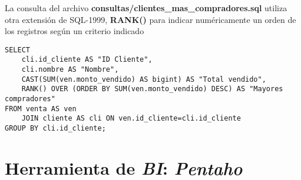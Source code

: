 La consulta del archivo \textbf{consultas/clientes\_mas\_compradores.sql} utiliza otra extensión de SQL-1999, \textbf{RANK()} para indicar numéricamente un orden de los registros según un criterio indicado  

\vspace*{5mm}
\begin{lstlisting}[title=Clientes que generan mayores ingresos para la empresa]
SELECT 
    cli.id_cliente AS "ID Cliente", 
    cli.nombre AS "Nombre", 
    CAST(SUM(ven.monto_vendido) AS bigint) AS "Total vendido", 
    RANK() OVER (ORDER BY SUM(ven.monto_vendido) DESC) AS "Mayores compradores" 
FROM venta AS ven 
    JOIN cliente AS cli ON ven.id_cliente=cli.id_cliente 
GROUP BY cli.id_cliente;
\end{lstlisting}




\section{Herramienta de \emph{BI}: \emph{Pentaho}}






\clearpage
\printbibliography



